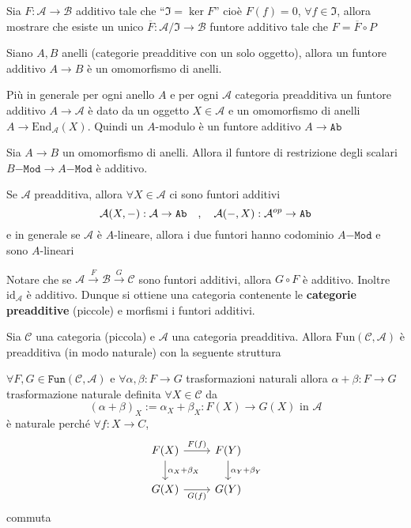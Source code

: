 \begin{eser}{}
    Sia \(F : \mathcal{A} \to \mathcal{B}\) additivo tale che ``\(\mathfrak{I} = \ker F\)'' cioè \(F{(f)} = 0 \), \(\forall f \in \mathfrak{I}\), allora mostrare che esiste un unico \(\overline{F} : \mathcal{A}/\mathfrak{I} \to \mathcal{B}\) funtore additivo tale che \(F = \overline{F} \circ P\) 
\end{eser}

\begin{example}{}
    Siano \(A, B\) anelli (categorie preadditive con un solo oggetto), allora un
    funtore additivo \(A\to B\) è un omomorfismo di anelli.

    Più in generale per ogni anello \(A\) e per ogni \(\mathcal{A}\) categoria
    preadditiva un funtore additivo \( A \to \mathcal{A}\) è dato da un oggetto
    \(X \in \mathcal{A}\) e un omomorfismo di anelli \(A \to \mathrm{End}_\mathcal{A}{(X)}\).
    Quindi un \(A\)-modulo è un funtore additivo \(A \to \mathtt{Ab}\) 
\end{example}

\begin{example}{}
    Sia \(A\to B\) un omomorfismo di anelli. Allora il funtore di restrizione
    degli scalari \(B\mathtt{-Mod} \to A\mathtt{-Mod}\) è additivo.
\end{example}

\begin{example}{}
    Se \(\mathcal{A}\) preadditiva, allora \(\forall X \in \mathcal{A}\) ci sono
    funtori additivi
    \[
      \mathcal{A}{(X, \--)} : \mathcal{A} \to \mathtt{Ab} \quad , \quad \mathcal{A}{(\-- , X)} : \mathcal{A}^{op} \to \mathtt{Ab}
    \]
    e in generale se \(
    \mathcal{A}\) è \(A\)-lineare, allora i due funtori hanno codominio \(A\mathtt{-Mod}\) 
    e sono \(A\)-lineari
\end{example}

Notare che se \(\mathcal{A} \overset{F}{\to } \mathcal{B} \overset{G}{\to } \mathcal{C}\) 
sono funtori additivi, allora \(G \circ F\) è additivo.
Inoltre \(\mathrm{id}_\mathcal{A}\) è additivo. 
Dunque si ottiene una categoria contenente le \textbf{categorie preadditive}
(piccole) e morfismi i funtori additivi.

    Sia \(\mathcal{C}\) una categoria (piccola) e \(\mathcal{A}\) una categoria
    preadditiva. Allora \(\mathrm{Fun}{(\mathcal{C}, \mathcal{A})}\) è
    preadditiva (in modo naturale) con la seguente struttura

    \(\forall F, G \in \mathtt{Fun}{(\mathcal{C}, \mathcal{A})}\) e \(\forall \alpha, \beta : F \to G\) trasformazioni
    naturali allora \(\alpha + \beta : F \to G\) trasformazione naturale
    definita \(\forall X \in \mathcal{C}\) da
    \[
      {(\alpha + \beta)}_X := \alpha_X + \beta_X : F{(X)} \to G{(X)} \text{ in }
      \mathcal{A}
    \]
    è naturale perché \(
    \forall f : X \to C\), 
\[\begin{tikzcd}
	{F(X)} & {F(Y)} \\
	{G{(X)}} & {G{(Y)}}
	\arrow["{F(f)}", from=1-1, to=1-2]
	\arrow["{\alpha_X + \beta_X}", from=1-1, to=2-1]
	\arrow["{\alpha_Y + \beta_Y}", from=1-2, to=2-2]
	\arrow["{G{(f)}}"', from=2-1, to=2-2]
\end{tikzcd}\]
commuta

